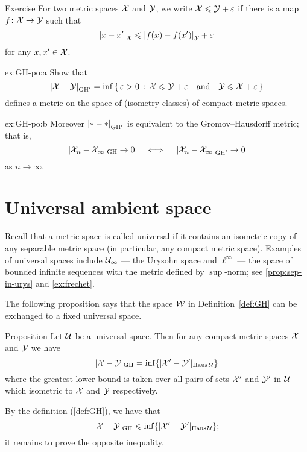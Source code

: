 \begin{thm}{Exercise}\label{ex:GH-po}
For two metric spaces $\mathcal{X}$ and $\mathcal{Y}$,
we write $\mathcal{X}\leqslant \mathcal{Y}+\varepsilon$ if
there is a map $f\colon\mathcal{X}\to \mathcal{Y}$ such that 
\[\dist{x}{x'}{\spc{X}}\le \dist{f(x)}{f(x')}{\spc{Y}}+\eps\]
for any $x,x'\in \mathcal{X}$.

\begin{subthm}{ex:GH-po:a}
Show that 
$$\dist{\spc{X}}{\spc{Y}}{\GH'}=\inf\set{\eps>0}{\spc{X}\le \spc{Y}+\eps
\quad\text{and}\quad
\spc{Y}\le \spc{X}+\eps}$$
defines a metric on the space of (isometry classes) of compact metric spaces.
\end{subthm}

\begin{subthm}{ex:GH-po:b}
Moreover $\dist{*}{*}{\GH'}$ is equivalent to the Gromov--Hausdorff metric;
that is,
$$|\spc{X}_n-\spc{X}_\infty|_{\GH}\to 0 
\quad\iff\quad 
\dist{\spc{X}_n}{\spc{X}_\infty}{\GH'}\to 0$$ 
as $n\to\infty$.
\end{subthm}
\end{thm}

\section{Universal ambient space}

Recall that a metric space is called universal if it contains an isometric copy of any separable metric space (in particular, any compact metric space).
Examples of universal spaces include $\mathcal{U}_\infty$ --- the Urysohn space and $\ell^\infty$ --- the space of bounded infinite sequences with the metric defined by $\sup$-norm; see \ref{prop:sep-in-urys} and \ref{ex:frechet}.

The following proposition says that the space $\mathcal{W}$ in Definition~\ref{def:GH} can be exchanged to a fixed universal space.

\begin{thm}{Proposition}\label{prop:GH-with-fixed-Z}
Let $\mathcal{U}$ be a universal space.
Then for any compact metric spaces $\mathcal{X}$ and $\mathcal{Y}$ we have
$$|\mathcal{X}-\mathcal{Y}|_{\operatorname{\rm GH}\nolimits} = \inf \{|\mathcal{X}'-\mathcal{Y}'|_{\operatorname{\rm Haus}\nolimits\mathcal{U}}\}$$ 
where the greatest lower bound is taken over all pairs of sets $\mathcal{X}'$ and $\mathcal{Y}'$ in $\mathcal{U}$
which isometric to  $\mathcal{X}$ and $\mathcal{Y}$ respectively.  
\end{thm}




By the definition (\ref{def:GH}), we have that 
\[|\mathcal{X}-\mathcal{Y}|_{\operatorname{\rm GH}\nolimits} \leqslant \inf \{|\mathcal{X}'-\mathcal{Y}'|_{\operatorname{\rm Haus}\nolimits\mathcal{U}}\};\]
it remains to prove the opposite inequality.

